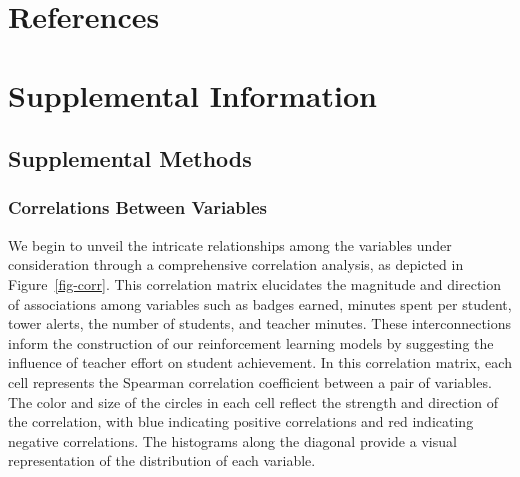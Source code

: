 \documentclass[
  number,
  preprint,
  3p,
  onecolumn]{elsarticle}
\begin{document}
\section{References}\label{references}

\renewcommand{\bibsection}{}


\newpage{}

\section{Supplemental Information}\label{supplemental-information}

\subsection{Supplemental Methods}\label{supplemental-methods}

\subsubsection{Correlations Between
Variables}\label{correlations-between-variables}

We begin to unveil the intricate relationships among the variables under
consideration through a comprehensive correlation analysis, as depicted
in Figure~\ref{fig-corr}. This correlation matrix elucidates the
magnitude and direction of associations among variables such as badges
earned, minutes spent per student, tower alerts, the number of students,
and teacher minutes. These interconnections inform the construction of
our reinforcement learning models by suggesting the influence of teacher
effort on student achievement. In this correlation matrix, each cell
represents the Spearman correlation coefficient between a pair of
variables. The color and size of the circles in each cell reflect the
strength and direction of the correlation, with blue indicating positive
correlations and red indicating negative correlations. The histograms
along the diagonal provide a visual representation of the distribution
of each variable.
\end{document}

